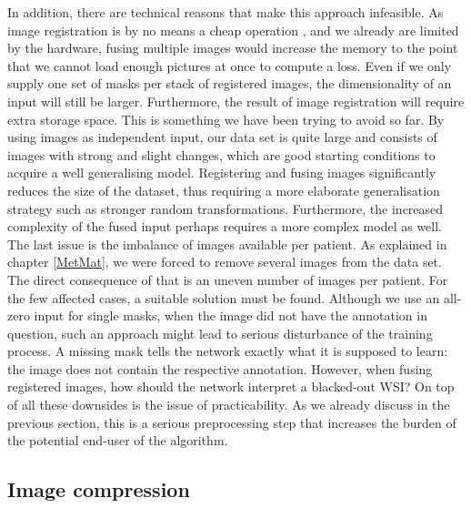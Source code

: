In addition, there are technical reasons that make this approach infeasible. 
As image registration is by no means a cheap operation \cite{Levy2020PathFlow}, and we already are limited by the hardware, fusing multiple images would increase the memory to the point that we cannot load enough pictures at once to compute a loss. Even if we only supply one set of masks per stack of registered images, the dimensionality of an input will still be larger. Furthermore, the result of image registration will require extra storage space. This is something we have been trying to avoid so far. 
By using images as independent input, our data set is quite large and consists of images with strong and slight changes, which are good starting conditions to acquire a well generalising model. Registering and fusing images significantly reduces the size of the dataset, thus requiring a more elaborate generalisation strategy such as stronger random transformations. Furthermore, the increased complexity of the fused input perhaps requires a more complex model as well. The last issue is the imbalance of images available per patient. As explained in chapter \ref{MetMat}, we were forced to remove several images from the data set. The direct consequence of that is an uneven number of images per patient. For the few affected cases, a suitable solution must be found. Although we use an all-zero input for single masks, when the image did not have the annotation in question, such an approach might lead to serious disturbance of the training process. A missing mask tells the network exactly what it is supposed to learn: the image does not contain the respective annotation. However, when fusing registered images, how should the network interpret a blacked-out WSI?
On top of all these downsides is the issue of practicability. As we already discuss in the previous section, this is a serious preprocessing step that increases the burden of the potential end-user of the algorithm.

\subsection{Image compression}

